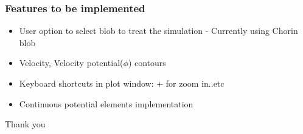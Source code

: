 \documentclass{beamer}
\begin{document}
\begin{frame}
	\frametitle{Features to be implemented}
	\begin{itemize}
		\item User option to select \alert{blob} to treat the simulation - Currently using \alert{Chorin} blob
			\pause
		\item Velocity, Velocity potential($\phi$) contours
			\pause
		\item Keyboard shortcuts in plot window: \alert{+} for zoom in..etc
			\pause
		\item Continuous potential elements implementation
	\end{itemize}
\end{frame}

\begin{frame}
	\begin{center}
		\Huge{Thank you}
	\end{center}
\end{frame}
\end{document}
